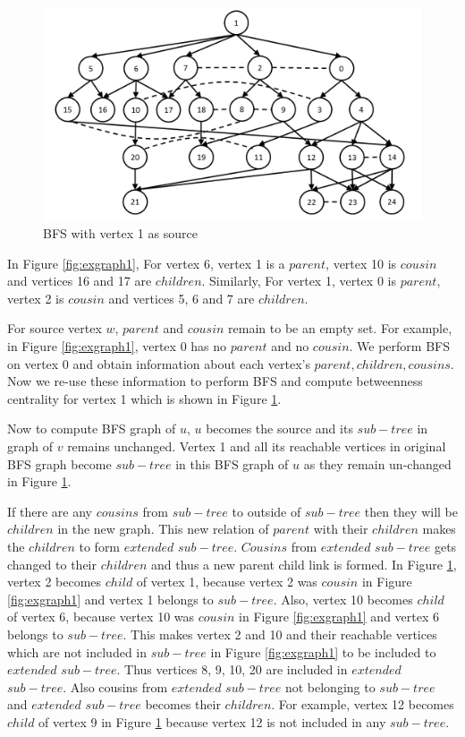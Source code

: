 \begin{figure}
\hspace{-4.5em}
\includegraphics[width=19cm]{images/Slide2.PNG}
\caption{BFS with vertex 1 as source}
\label{fig:exgraph2}
\end{figure}

In Figure \ref{fig:exgraph1}, For vertex 6, vertex 1 is a $parent$, vertex 10 is $cousin$ and vertices 16 and 17 are $ children$. Similarly, For vertex 1, vertex 0 is $parent$, vertex 2 is $cousin$ and vertices 5, 6 and 7 are $children$. 

For source vertex $w$, $parent$ and $cousin$ remain to be an empty set.
For example, in Figure \ref{fig:exgraph1}, vertex 0 has no $parent$ and no $cousin$.
We perform BFS on vertex 0 and obtain information about each vertex's $parent, children, cousins$. Now we re-use these information to perform BFS and compute betweenness centrality for vertex 1 which is shown in Figure \ref{fig:exgraph2}.

Now to compute BFS graph of $u$, $u$ becomes the source and its $sub - tree$ in graph of $v$ remains unchanged.
Vertex 1 and all its reachable vertices in original BFS graph become $sub - tree$ in this BFS graph of $u$ as they remain un-changed in Figure \ref{fig:exgraph2}.

If there are any $cousins$ from $sub - tree$ to outside of $sub - tree$ then they will be $children$ in the new graph. This new relation of $parent$ with their $children$ makes the $children$ to form $extended$ $sub - tree$.
$Cousins$ from $extended$ $sub - tree$ gets changed to their $children$ and thus a new parent child link is formed.
In Figure \ref{fig:exgraph2}, vertex 2 becomes $child$ of vertex 1, because vertex 2 was $cousin$ in Figure \ref{fig:exgraph1} and vertex 1 belongs to $sub - tree$. Also, vertex 10 becomes $child$ of vertex 6, because vertex 10 was $cousin$ in Figure \ref{fig:exgraph1} and vertex 6 belongs to $sub - tree$. This makes vertex 2 and 10 and their reachable vertices which are not included in $sub - tree$ in Figure \ref{fig:exgraph1} to be included to $extended$ $sub - tree$. Thus vertices 8, 9, 10, 20 are included in $extended$ $sub - tree$. Also cousins from $extended$ $sub - tree$ not belonging to $sub - tree$ and $extended$ $sub - tree$ becomes their $children$. For example, vertex 12 becomes $child$ of vertex 9 in Figure \ref{fig:exgraph2} because vertex 12 is not included in any $sub - tree$. 

